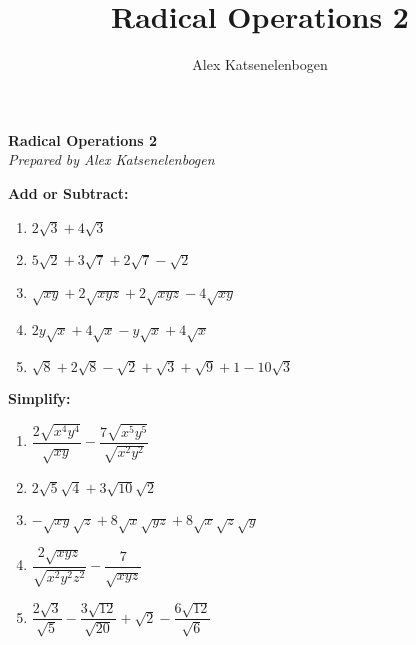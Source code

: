 \documentclass{article}
\title{Radical Operations 2}
\author{Alex Katsenelenbogen}
\begin{document}
\begin{center}
      \Large\textbf{Radical Operations 2}\\
      \large\textit{Prepared by Alex Katsenelenbogen}
 \end{center}


\vspace{1cm}
\noindent \textbf{Add or Subtract:}
\begin{enumerate}
\itemsep1.5em 
\item $2\sqrt{3}  + 4\sqrt{3}$
\item $5\sqrt{2}  + 3\sqrt{7} + 2\sqrt{7} - \sqrt{2}$
\item $\sqrt{xy}  + 2\sqrt{xyz} + 2\sqrt{xyz} - 4\sqrt{xy}$
\item $2y\sqrt{x}  + 4\sqrt{x} - y\sqrt{x}  + 4\sqrt{x}$
\item $\sqrt{8} + 2\sqrt{8} - \sqrt{2} + \sqrt{3} + \sqrt{9} + 1 - 10\sqrt{3}$

\end{enumerate}
\vspace{1cm}
\textbf{Simplify:}
\begin{enumerate}
\itemsep1.5em 
\item $\dfrac{2\sqrt{x^4y^4}}{\sqrt{xy}} - \dfrac{7\sqrt{x^5y^5}}{\sqrt{x^2y^2}}$
\item $2\sqrt{5}\sqrt{4} + 3\sqrt{10}\sqrt{2}$
\item $-\sqrt{xy}\sqrt{z} + 8\sqrt{x}\sqrt{yz} +8\sqrt{x}\sqrt{z}\sqrt{y} $
\item $\dfrac{2\sqrt{xyz}}{\sqrt{x^2y^2z^2}} - \dfrac{7}{\sqrt{xyz}}$
\item $\dfrac{2\sqrt{3}}{\sqrt{5}} - \dfrac{3\sqrt{12}}{\sqrt{20}} + \sqrt{2} - \dfrac{6\sqrt{12}}{\sqrt{6}}$
\end{enumerate}
\end{document}
